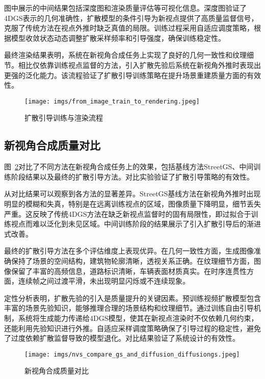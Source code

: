 图中展示的中间结果包括深度图和渲染质量评估等可视化信息。深度图验证了4DGS表示的几何准确性，扩散模型的条件引导为新视点提供了高质量监督信号，克服了传统方法在视点外推时缺乏真值的局限。训练过程采用自适应调度策略，根据模型收敛状态动态调整扩散采样频率和引导强度，确保训练稳定性。

最终渲染结果表明，系统在新视角合成任务上实现了良好的几何一致性和纹理细节。相比仅依靠训练视点监督的方法，引入扩散先验后系统在新视角外推时表现出更强的泛化能力。该流程验证了扩散引导训练策略在提升场景重建质量方面的有效性。

\begin{figure}[htbp]
  \centering
  \texttt{[image: imgs/from\_image\_train\_to\_rendering.jpeg]}
  \caption{扩散引导训练与渲染流程}
  \label{fig:training-pipeline}
\end{figure}

\subsection{新视角合成质量对比}

图~\ref{fig:nvs-comparison}对比了不同方法在新视角合成任务上的效果，包括基线方法StreetGS、中间训练阶段结果以及最终的扩散引导方法。对比实验验证了扩散引导策略的有效性。

从对比结果可以观察到各方法的显著差异。StreetGS基线方法在新视角外推时出现明显的模糊和失真，特别是在远离训练视点的区域，图像质量下降明显，细节丢失严重。这反映了传统4DGS方法在缺乏新视点监督时的固有局限性，即过拟合于训练视点而难以泛化到未见区域。中间训练阶段的结果展示了引入扩散引导后的渐进式改善。

最终的扩散引导方法在多个评估维度上表现优异。在几何一致性方面，生成图像准确保持了场景的空间结构，建筑物轮廓清晰，透视关系正确。在纹理细节方面，图像保留了丰富的高频信息，道路标识清晰，车辆表面材质真实。在时序连贯性方面，连续帧之间过渡平滑，未出现明显闪烁或不连续现象。

定性分析表明，扩散先验的引入是质量提升的关键因素。预训练视频扩散模型包含丰富的场景先验知识，能够推理合理的场景结构和纹理细节。通过训练自由引导机制，系统将生成能力传递给4DGS模型，使其在新视点渲染时不仅依赖几何约束，还能利用先验知识进行外推。自适应采样调度策略确保了引导过程的稳定性，避免了过度依赖扩散监督导致的模型退化。对比结果验证了系统设计的有效性。

\begin{figure}[htbp]
  \centering
  \texttt{[image: imgs/nvs\_compare\_gs\_and\_diffusion\_diffusiongs.jpeg]}
  \caption{新视角合成质量对比}
  \label{fig:nvs-comparison}
\end{figure}

